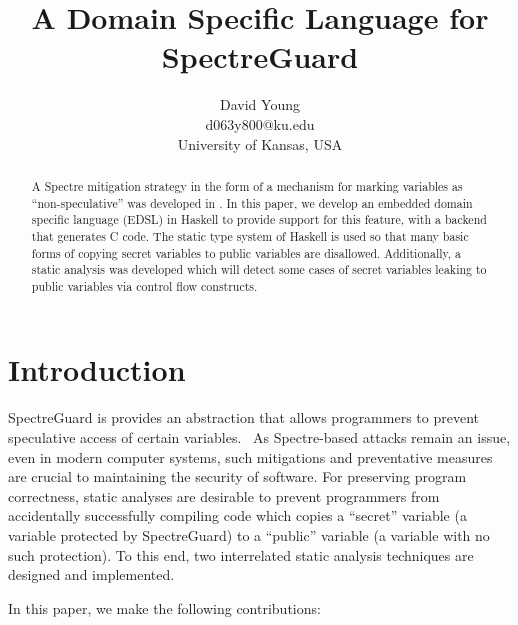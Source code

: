 \documentclass[10pt, conference]{IEEEtran}
\begin{document}
\title{A Domain Specific Language for SpectreGuard}
\author{David Young\\
d063y800@ku.edu\\
University of Kansas, USA\\
}

\maketitle
\thispagestyle{empty}
\begin{abstract}

  A Spectre mitigation strategy in the form of a mechanism for marking variables
  as ``non-speculative'' was developed in \cite{SpectreGuard}. In this paper, we
  develop an embedded domain specific language (EDSL) in Haskell to provide
  support for this feature, with a backend that generates C code. The static
  type system of Haskell is used so that many basic forms of copying secret
  variables to public variables are disallowed. Additionally, a static analysis
  was developed which will detect some cases of secret variables leaking to
  public variables via control flow constructs.

\end{abstract}


\section{Introduction}
\label{sec:Introduction}
SpectreGuard is provides an abstraction that allows programmers to prevent
speculative access of certain variables.~\cite{SpectreGuard} As Spectre-based
attacks remain an issue, even in modern computer systems, such mitigations and
preventative measures are crucial to maintaining the security of software.  For
preserving program correctness, static analyses are desirable to prevent
programmers from accidentally successfully compiling code which copies a
``secret'' variable (a variable protected by SpectreGuard) to a ``public''
variable (a variable with no such protection). To this end, two interrelated
static analysis techniques are designed and implemented.

In this paper, we make the following contributions:
\end{document}
